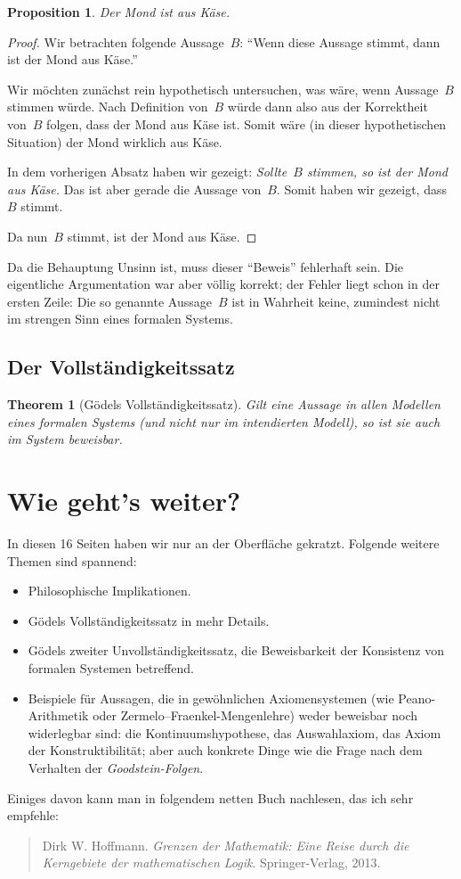 \documentclass[twoside]{../zirkelblatt1415}
\theoremstyle{definition}
\theoremstyle{plain}
\newtheorem{prop}[defn]{Proposition}
\newtheorem{thm}[defn]{Theorem}
\theoremstyle{remark}
\begin{document}
\begin{prop}Der Mond ist aus Käse.\end{prop}
\begin{proof}Wir betrachten folgende Aussage~$B$: "`Wenn diese Aussage stimmt,
dann ist der Mond aus Käse."'

Wir möchten zunächst rein hypothetisch untersuchen, was wäre, wenn Aussage~$B$
stimmen würde. Nach Definition von~$B$ würde dann also aus der Korrektheit
von~$B$ folgen, dass der Mond aus Käse ist. Somit wäre (in dieser
hypothetischen Situation) der Mond wirklich aus Käse.

In dem vorherigen Absatz haben wir gezeigt: \emph{Sollte~$B$ stimmen, so ist der Mond
aus Käse.} Das ist aber gerade die Aussage von~$B$. Somit haben wir gezeigt,
dass~$B$ stimmt.

Da nun~$B$ stimmt, ist der Mond aus Käse.
\end{proof}

Da die Behauptung Unsinn ist, muss dieser "`Beweis"' fehlerhaft sein. Die
eigentliche Argumentation war aber völlig korrekt; der Fehler liegt schon in der
ersten Zeile: Die so genannte Aussage~$B$ ist in Wahrheit keine, zumindest
nicht im strengen Sinn eines formalen Systems.


\subsection{Der Vollständigkeitssatz}

\begin{thm}[Gödels Vollständigkeitssatz]
Gilt eine Aussage in allen Modellen eines formalen Systems (und nicht nur im
intendierten Modell), so ist sie auch im System beweisbar.
\end{thm}


\section{Wie geht's weiter?}

In diesen 16 Seiten haben wir nur an der Oberfläche gekratzt. Folgende weitere
Themen sind spannend:
\begin{itemize}
\item Philosophische Implikationen.
\item Gödels Vollständigkeitssatz in mehr Details.
\item Gödels zweiter Unvollständigkeitssatz, die Beweisbarkeit der Konsistenz
von formalen Systemen betreffend.
\item Beispiele für Aussagen, die in gewöhnlichen Axiomensystemen (wie
Peano-Arith\-me\-tik oder Zermelo--Fraenkel-Mengenlehre) weder beweisbar noch
widerlegbar sind: die Kontinuumshypothese, das Auswahlaxiom, das Axiom der
Konstruktibilität; aber auch konkrete Dinge wie die Frage nach dem Verhalten
der \emph{Goodstein-Folgen}.
\end{itemize}

Einiges davon kann man in folgendem netten Buch nachlesen, das ich sehr
empfehle:
\begin{quote}
Dirk W. Hoffmann. \emph{Grenzen der Mathematik: Eine Reise durch die
Kerngebiete der mathematischen Logik}. Springer-Verlag, 2013.
\end{quote}
\end{document}
